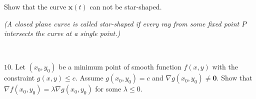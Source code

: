 \documentclass{article}
\def\noi{\noindent}%
\def\le{\leqslant}%
\begin{document}
Show that the curve $\textbf{x}(t)$ can not be star-shaped.

\emph{(A closed plane curve is called star-shaped if every ray from some fixed point $P$ intersects the curve at a single point.)}

\ 

\noi
$10$. Let $(x_0,y_0)$ be a minimum point of smooth function $f(x,y)$ with the constraint $g(x,y)\le c$.
Assume $g(x_0,y_0)=c$ and $\nabla g(x_0,y_0)\ne \textbf{0}$.
Show that  
$\nabla f(x_0,y_0)=\lambda \nabla g(x_0,y_0)$
for some $\lambda\le 0$.
\end{document}
